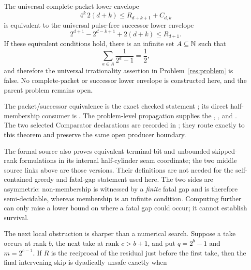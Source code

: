 \documentclass[11pt]{article}
\begin{document}
\begin{theorem}
\label{res:actual-upper-successor}
The universal complete-packet lower envelope
\[
  4^k\,2(d+k)\le R_{d+k+1}+C_{d,k}
\]
is equivalent to the universal pulse-free successor lower envelope
\[
  2^{d+1}-2^{d-k+1}+2(d+k)\le R_{d+1}.
\]
If these equivalent conditions hold, there is an infinite set
\(A\subseteq\mathbb{N}\) such that
\[
  \sum_{a\in A}\frac1{2^a-1}=\frac12,
\]
and therefore the universal irrationality assertion in
Problem~\ref{res:problem} is false.  No complete-packet or successor lower
envelope is constructed here, and the parent problem remains open.
\end{theorem}

\noindent The packet/successor equivalence is the exact checked statement
;
its direct half-membership consumer is
.
The problem-level propagation supplies the
,
,
and
.
The two selected Comparator declarations are recorded in
; they route
exactly to this theorem and preserve the same open producer boundary.

The formal source also proves equivalent terminal-bit and unbounded
skipped-rank formulations in its internal half-cylinder seam coordinate; the
two middle source links above are those versions.  Their definitions are not
needed for the self-contained greedy and fatal-gap statement used here.
The two sides are asymmetric: non-membership is witnessed by a \emph{finite}
fatal gap and is therefore semi-decidable, whereas membership is an infinite
condition.  Computing further can only raise a lower bound on where a fatal
gap could occur; it cannot establish survival.

The next local obstruction is sharper than a numerical search.  Suppose a
take occurs at rank $b$, the next take at rank $c>b+1$, and put
$q=2^b-1$ and $m=2^{c-1}$.  If $R$ is the reciprocal of the residual just
before the first take, then the final intervening skip is dyadically unsafe
exactly when
\end{document}
